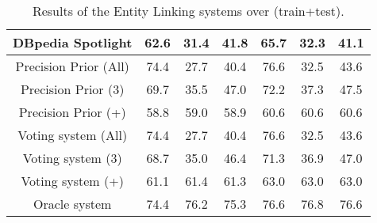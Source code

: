 \begin{table}[h!]
{\begin{tabular}{|c|ccc|ccc|}
    DBpedia Spotlight                & 62.6                                 & 31.4                                    & 41.8              & 65.7                                 & 32.3                                    & 41.1              \\ \hline
    Precision Prior (All)            & 74.4                                 & 27.7                                    & 40.4              & 76.6                                 & 32.5                                    & 43.6              \\
    Precision Prior (3)              & 69.7                                 & 35.5                                    & 47.0              & 72.2                                 & 37.3                                    & 47.5              \\
    Precision Prior (+)              & 58.8                                 & 59.0                                    & 58.9              & 60.6                                 & 60.6                                    & 60.6              \\ \hline
    Voting system (All)     & 74.4                        & 27.7                           & 40.4     & 76.6                        & 32.5                           & 43.6     \\
    Voting system (3)                & 68.7                                 & 35.0                                    & 46.4              & 71.3                                 & 36.9                                    & 47.0              \\
    Voting system (+)       & 61.1                        & 61.4                           & 61.3     & 63.0                        & 63.0                           & 63.0     \\ \hline
    Oracle system                    & 74.4                                 & 76.2                                    & 75.3              & 76.6                                 & 76.8                                    & 76.6              \\ \hline
    \end{tabular}%
    }
    \caption{ Results of the Entity Linking systems over \QALDseven{} (train+test).}
    \label{table:elResultsQald7}
\end{table}

